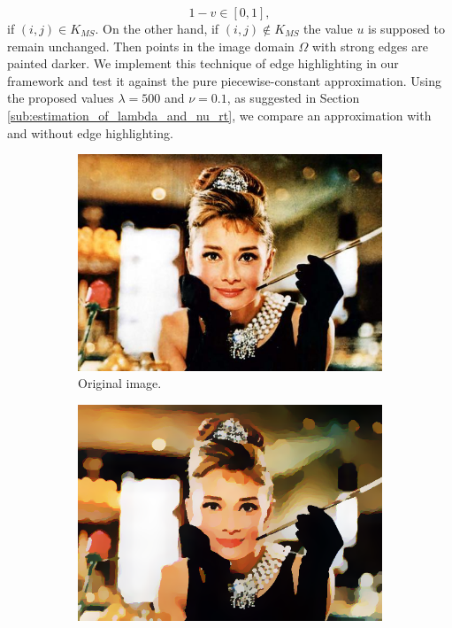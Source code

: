 \documentclass[abstracton]{scrreprt}
\begin{document}
                $$
                    1 - v \in [0, 1],
                $$
            if $(i, j) \in K_{MS}$. On the other hand, if $(i, j) \notin K_{MS}$ the value $u$ is supposed to remain unchanged. Then points in the image domain $\Omega$ with strong edges are painted darker. We implement this technique of edge highlighting in our framework and test it against the pure piecewise-constant approximation. Using the proposed values $\lambda = 500$ and $\nu = 0.1$, as suggested in Section \ref{sub:estimation_of_lambda_and_nu_rt}, we compare an approximation with and without edge highlighting.
            \begin{figure}[!ht]
                \centering
                \begin{subfigure}[b]{0.32\textwidth}
                    \includegraphics[width=\textwidth]{img/images/hepburn.png}
                    \caption{Original image.}
                \end{subfigure}
                \begin{subfigure}[b]{0.32\textwidth}
                    \includegraphics[width=\textwidth]{img/cartooning/best_pwc_hepburn.png}

\end{subfigure}
\end{figure}
\end{document}
